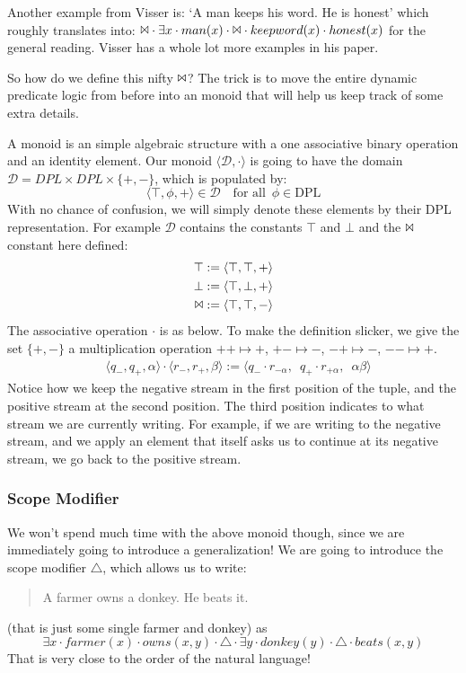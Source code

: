 \documentclass[12pt]{article}
\begin{document}
Another example from Visser is: `A man keeps his word. He is honest' which roughly translates into: $\Bowtie\cdot\exists x\cdot man(x)\cdot\Bowtie\cdot keepword(x)\cdot honest(x)$ for the general reading. Visser has a whole lot more examples in his paper\cite{visser1999donkey}.

So how do we define this nifty $\Bowtie$? The trick is to move the entire dynamic predicate logic from before into an monoid that will help us keep track of some extra details.

A monoid is an simple algebraic structure with a one associative binary operation and an identity element. Our monoid $\langle\mathcal{D},\cdot\rangle$ is going to have the domain $\mathcal{D}=DPL\times DPL\times\{+,-\}$, which is populated by:
\begin{equation}
\langle\top,\phi,+\rangle \in \mathcal{D} \quad \text{for all}\enspace \phi\in\text{DPL}
\end{equation}
With no chance of confusion, we will simply denote these elements by their DPL representation. For example $\mathcal{D}$ contains the constants $\top$ and $\bot$ and the $\Bowtie$ constant here defined:
\begin{align}
\top &:= \langle \top, \top, + \rangle \\
\bot &:= \langle \top, \bot, + \rangle \\
\Bowtie &:= \langle \top, \top, - \rangle
\end{align}
The associative operation $\cdot$ is as below. To make the definition slicker, we give the set $\{+,-\}$ a multiplication operation $++\mapsto+$, $+-\mapsto-$, $-+\mapsto-$, $--\mapsto+$.
\begin{align}
&\langle q_-, q_+, \alpha \rangle \cdot \langle r_-, r_+, \beta \rangle := \langle q_- \cdot r_{-\alpha},\enspace q_+ \cdot r_{+\alpha},\enspace  \alpha\beta \rangle
\end{align}
%
Notice how we keep the negative stream in the first position of the tuple, and the positive stream at the second position. The third position indicates to what stream we are currently writing. For example, if we are writing to the negative stream, and we apply an element that itself asks us to continue at its negative stream, we go back to the positive stream.

\subsubsection{Scope Modifier}
We won't spend much time with the above monoid though, since we are immediately going to introduce a generalization! We are going to introduce the scope modifier $\triangle$, which allows us to write:
%
\begin{quote}
A farmer owns a donkey. He beats it.
\end{quote}
%
(that is just some single farmer and donkey) as
%
\begin{equation}
\exists x \cdot farmer(x) \cdot owns(x,y) \cdot \triangle \cdot \exists y \cdot donkey(y) \cdot \triangle \cdot beats(x,y)
\end{equation}
%
That is very close to the order of the natural language!
\end{document}
